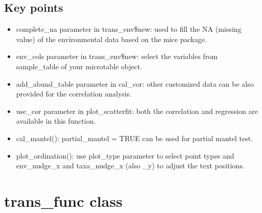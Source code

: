 \documentclass[
]{book}
\newenvironment{Shaded}{\begin{snugshade}}{\end{snugshade}}
\newcommand{\AttributeTok}[1]{\textcolor[rgb]{0.77,0.63,0.00}{#1}}
\newcommand{\CommentTok}[1]{\textcolor[rgb]{0.56,0.35,0.01}{\textit{#1}}}
\newcommand{\DecValTok}[1]{\textcolor[rgb]{0.00,0.00,0.81}{#1}}
\newcommand{\FloatTok}[1]{\textcolor[rgb]{0.00,0.00,0.81}{#1}}
\newcommand{\FunctionTok}[1]{\textcolor[rgb]{0.00,0.00,0.00}{#1}}
\newcommand{\NormalTok}[1]{#1}
\newcommand{\OtherTok}[1]{\textcolor[rgb]{0.56,0.35,0.01}{#1}}
\newcommand{\SpecialCharTok}[1]{\textcolor[rgb]{0.00,0.00,0.00}{#1}}
\newcommand{\StringTok}[1]{\textcolor[rgb]{0.31,0.60,0.02}{#1}}
\providecommand{\tightlist}{%
  \setlength{\itemsep}{0pt}\setlength{\parskip}{0pt}}
\begin{document}
\begin{Shaded}
\end{Shaded}

\hypertarget{key-points-9}{%
\subsection{Key points}\label{key-points-9}}

\begin{itemize}
\tightlist
\item
  complete\_na parameter in trans\_env\$new: used to fill the NA (missing value) of the environmental data based on the mice package.
\item
  env\_cols parameter in trans\_env\$new: select the variables from sample\_table of your microtable object.
\item
  add\_abund\_table parameter in cal\_cor: other customized data can be also provided for the correlation analysis.
\item
  use\_cor parameter in plot\_scatterfit: both the correlation and regression are available in this function.
\item
  cal\_mantel(): partial\_mantel = TRUE can be used for partial mantel test.
\item
  plot\_ordination(): use plot\_type parameter to select point types and env\_nudge\_x and taxa\_nudge\_x (also \_y) to adjust the text positions.
\end{itemize}

\hypertarget{trans_func-class}{%
\section{trans\_func class}\label{trans_func-class}}
\end{document}
